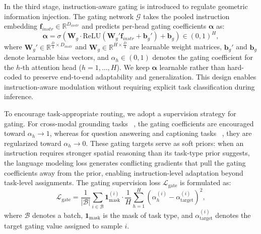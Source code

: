 \documentclass[lettersize,journal]{IEEEtran}
\begin{document}
In the third stage, instruction-aware gating is introduced to regulate geometric information injection. The gating network $\mathcal{G}$ takes the pooled instruction embedding $\mathbf{f}_{instr} \in \mathbb{R}^{D_{instr}}$ and predicts per-head gating coefficients $\boldsymbol{\alpha}$ as:
\begin{equation}
\boldsymbol{\alpha} = \sigma(\mathbf{W}_g \cdot \text{ReLU}(\mathbf{W}_g' \mathbf{f}_{instr} + \mathbf{b}_g') + \mathbf{b}_g) \in (0,1)^H,
\end{equation}
where $\mathbf{W}_g' \in \mathbb{R}^{\frac{D}{4} \times D_{instr}}$ and $\mathbf{W}_g \in \mathbb{R}^{H \times \frac{D}{4}}$ are learnable weight matrices, $\mathbf{b}_g'$ and $\mathbf{b}_g$ denote learnable bias vectors, and $\alpha_h \in (0,1)$ denotes the gating coefficient for the $h$-th attention head ($h = 1, \dots, H$). We keep $\boldsymbol{\alpha}$ learnable rather than hard-coded to preserve end-to-end adaptability and generalization. This design enables instruction-aware modulation without requiring explicit task classification during inference.

To encourage task-appropriate routing, we adopt a supervision strategy for gating. For cross-modal grounding tasks {~\cite{scanrefer2020, multi3drefer2023}}, the gating coefficients are encouraged toward $\alpha_h \rightarrow 1$, whereas for question answering and captioning tasks {~\cite{scanqa2022,scan2cap2021}}, they are regularized toward $\alpha_h \rightarrow 0$. These gating targets serve as soft priors: when an instruction requires stronger spatial reasoning than its task-type prior suggests, the language modeling loss generates conflicting gradients that pull the gating coefficients away from the prior, enabling instruction-level adaptation beyond task-level assignments. The gating supervision loss $\mathcal{L}_{\text{gate}}$ is formulated as:
\begin{equation}
\mathcal{L}_{\text{gate}} = \frac{1}{|\mathcal{B}|} \sum_{i \in \mathcal{B}} \mathbf{1}_{\text{mask}}^{(i)} \cdot \frac{1}{H} \sum_{h=1}^{H} (\alpha_h^{(i)} - \alpha_{\text{target}}^{(i)})^2,
\label{eq:gate_loss}
\end{equation}
where $\mathcal{B}$ denotes a batch, $\mathbf{1}_{\text{mask}}$ is the mask of task type, and $\alpha_{\text{target}}^{(i)}$ denotes the target gating value assigned to sample $i$.

\end{document}
